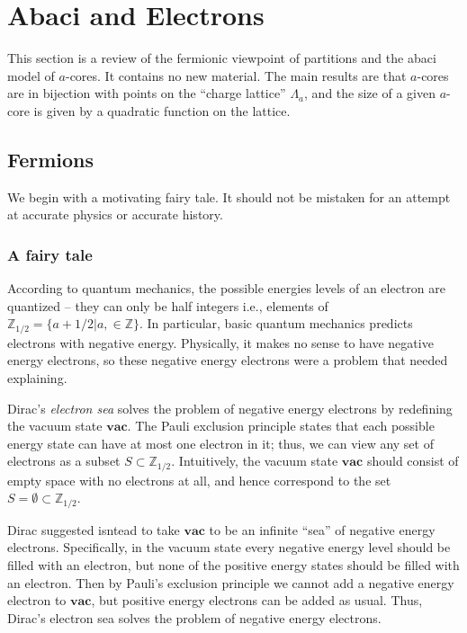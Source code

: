 \documentclass{amsart}[12pt]
\theoremstyle{definition}
\newtheorem{definition}[dummy]{Definition}
\newcommand{\Z}{\mathbb{Z}}
\newcommand{\R}{\mathbb{R}}
\newcommand{\vac}{\mathbf{vac}}
\begin{document}
\section{Abaci and Electrons} \label{sec:abacus}

This section is a review of the fermionic viewpoint of partitions and the abaci model of $a$-cores.  It contains no new material.  The main results are that $a$-cores are in bijection with points on the ``charge lattice'' $\Lambda_a$, and the size of a given $a$-core is given by a quadratic function on the lattice.



\subsection{Fermions}
 We begin with a motivating fairy tale. It should not be mistaken for an attempt at accurate physics or accurate history.


\subsubsection{A fairy tale}
According to quantum mechanics, the possible energies levels of an electron are quantized -- they can only be half integers i.e., elements of $\Z_{1/2}=\{a+1/2|a,\in\Z\}$.  In particular, basic quantum mechanics predicts electrons with negative energy.  Physically, it makes no sense to have negative energy electrons, so these negative energy electrons were a problem that needed explaining.


Dirac's \emph{electron sea} solves the problem of negative energy electrons by redefining the vacuum state $\vac$.  The Pauli exclusion principle states that each possible energy state can have at most one electron in it; thus, we can view any set of electrons as a subset $S\subset \Z_{1/2}$.  Intuitively, the vacuum state $\vac$ should consist of empty space with no electrons at all, and hence correspond to the set $S=\emptyset\subset\Z_{1/2}$.

Dirac suggested isntead to take $\vac$ to be an
infinite ``sea'' of negative energy electrons.   Specifically, in the vacuum state every negative energy level should be filled with an electron, but none of the positive energy states should be filled with an electron.  Then by Pauli's
exclusion principle we cannot add a negative energy electron
to $\vac$, but positive energy electrons can be added as usual.  Thus, Dirac's electron sea solves the problem of negative energy electrons.
\end{document}
